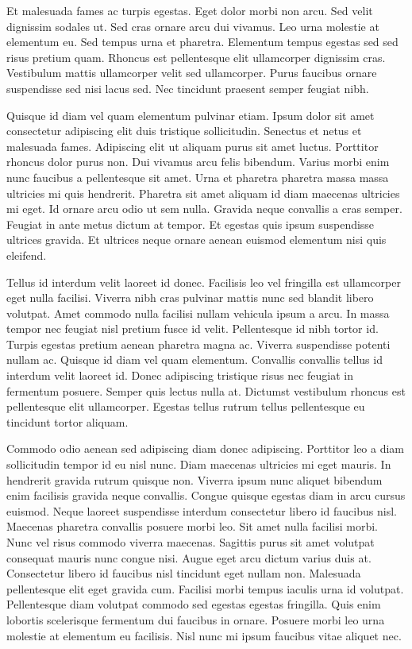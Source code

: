 Et malesuada fames ac turpis egestas. Eget dolor morbi non arcu. Sed 
velit dignissim sodales ut. Sed cras ornare arcu dui vivamus. Leo urna 
molestie at elementum eu. Sed tempus urna et pharetra. Elementum tempus 
egestas sed sed risus pretium quam. Rhoncus est pellentesque elit 
ullamcorper dignissim cras. Vestibulum mattis ullamcorper velit sed 
ullamcorper. Purus faucibus ornare suspendisse sed nisi lacus sed. Nec 
tincidunt praesent semper feugiat nibh.


Quisque id diam vel quam elementum pulvinar etiam. Ipsum dolor sit 
amet consectetur adipiscing elit duis tristique sollicitudin. Senectus 
et netus et malesuada fames. Adipiscing elit ut aliquam purus sit amet 
luctus. Porttitor rhoncus dolor purus non. Dui vivamus arcu felis 
bibendum. Varius morbi enim nunc faucibus a pellentesque sit amet. Urna 
et pharetra pharetra massa massa ultricies mi quis hendrerit. Pharetra 
sit amet aliquam id diam maecenas ultricies mi eget. Id ornare arcu odio
 ut sem nulla. Gravida neque convallis a cras semper. Feugiat in ante 
metus dictum at tempor. Et egestas quis ipsum suspendisse ultrices 
gravida. Et ultrices neque ornare aenean euismod elementum nisi quis 
eleifend.


Tellus id interdum velit laoreet id donec. Facilisis leo vel 
fringilla est ullamcorper eget nulla facilisi. Viverra nibh cras 
pulvinar mattis nunc sed blandit libero volutpat. Amet commodo nulla 
facilisi nullam vehicula ipsum a arcu. In massa tempor nec feugiat nisl 
pretium fusce id velit. Pellentesque id nibh tortor id. Turpis egestas 
pretium aenean pharetra magna ac. Viverra suspendisse potenti nullam ac.
 Quisque id diam vel quam elementum. Convallis convallis tellus id 
interdum velit laoreet id. Donec adipiscing tristique risus nec feugiat 
in fermentum posuere. Semper quis lectus nulla at. Dictumst vestibulum 
rhoncus est pellentesque elit ullamcorper. Egestas tellus rutrum tellus 
pellentesque eu tincidunt tortor aliquam.


Commodo odio aenean sed adipiscing diam donec adipiscing. Porttitor 
leo a diam sollicitudin tempor id eu nisl nunc. Diam maecenas ultricies 
mi eget mauris. In hendrerit gravida rutrum quisque non. Viverra ipsum 
nunc aliquet bibendum enim facilisis gravida neque convallis. Congue 
quisque egestas diam in arcu cursus euismod. Neque laoreet suspendisse 
interdum consectetur libero id faucibus nisl. Maecenas pharetra 
convallis posuere morbi leo. Sit amet nulla facilisi morbi. Nunc vel 
risus commodo viverra maecenas. Sagittis purus sit amet volutpat 
consequat mauris nunc congue nisi. Augue eget arcu dictum varius duis 
at. Consectetur libero id faucibus nisl tincidunt eget nullam non. 
Malesuada pellentesque elit eget gravida cum. Facilisi morbi tempus 
iaculis urna id volutpat. Pellentesque diam volutpat commodo sed egestas
 egestas fringilla. Quis enim lobortis scelerisque fermentum dui 
faucibus in ornare. Posuere morbi leo urna molestie at elementum eu 
facilisis. Nisl nunc mi ipsum faucibus vitae aliquet nec.


